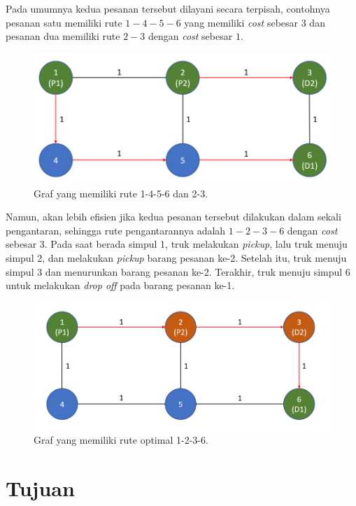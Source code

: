 Pada umumnya kedua pesanan tersebut dilayani secara terpisah, contohnya pesanan satu memiliki rute $1-4-5-6$
yang memiliki \textit{cost} sebesar $3$ dan pesanan dua memiliki rute $2-3$ dengan \textit{cost} sebesar $1$.


\begin{figure}[h]
    \centering
    \includegraphics[width=1.0\textwidth]{resources/graph_routes.png}
    \caption{Graf yang memiliki rute 1-4-5-6 dan 2-3.}
\end{figure}

Namun, akan lebih efisien jika kedua pesanan tersebut dilakukan dalam sekali pengantaran, sehingga rute pengantarannya adalah $1-2-3-6$ dengan \textit{cost} sebesar $3$.
Pada saat berada simpul 1, truk melakukan \textit{pickup}, lalu truk menuju simpul 2, dan melakukan \textit{pickup} barang pesanan ke-2. Setelah itu, truk menuju simpul 3
dan menurunkan barang pesanan ke-2. Terakhir, truk menuju simpul 6  untuk melakukan \textit{drop off} pada barang pesanan ke-1.

\begin{figure}[h]
    \centering
    \includegraphics[width=1.0\textwidth]{resources/graph_optimal.png}
    \caption{Graf yang memiliki rute optimal 1-2-3-6.}
\end{figure}

\section{Tujuan}

